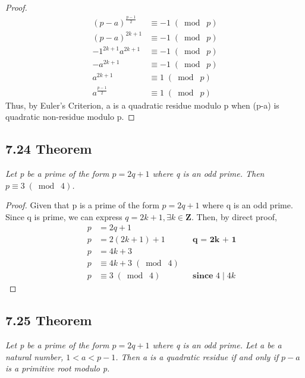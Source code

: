\documentclass{article}
\begin{document}
\begin{proof}
\begin{align*}
    &&(p-a)^{\frac{p-1}{2}} &\equiv -1 \;(\bmod\; p) && \\
    &&(p-a)^{2k+1} &\equiv -1 \;(\bmod\; p) &&\\
    &&-1^{2k+1}a^{2k+1} &\equiv -1 \;(\bmod\; p) &&\\
    &&-a^{2k+1} &\equiv -1 \;(\bmod\; p) &&\\
    &&a^{2k+1} &\equiv 1 \;(\bmod\; p) &&\\
    &&a^{\frac{p-1}{2}} &\equiv 1 \;(\bmod\; p) &&
\end{align*}
Thus, by Euler's Criterion, a is a quadratic residue modulo p when (p-a) is quadratic non-residue modulo p.
\end{proof}

\subsection*{7.24 Theorem} 
\quad \textit{Let p be a prime of the form $p=2q+1$ where q is an odd prime. Then $p \equiv 3 \;(\bmod\; 4)$.}

\begin{proof}
Given that p is a prime of the form $p=2q+1$ where q is an odd prime. Since q is prime, we can express $q = 2k+1,\exists k \in \mathbf{Z}$. Then, by direct proof,
\begin{align*}
    &&p &= 2q + 1&&\\
    &&p &= 2(2k+1) + 1&&\textbf{q = 2k + 1}\\
    &&p &= 4k+3&&\\
    &&p &\equiv 4k+3 \;(\bmod\; 4)&&\\
    &&p &\equiv 3 \;(\bmod\; 4)&& \textbf{since $4 \mid 4k$}
\end{align*}
\end{proof}

\subsection*{7.25 Theorem} 
\quad \textit{Let p be a prime of the form $p=2q+1$ where q is an odd prime. Let a be a natural number, $1<a<p-1$. Then a is a quadratic residue if and only if $p-a$ is a primitive root modulo p.}
\end{document}
